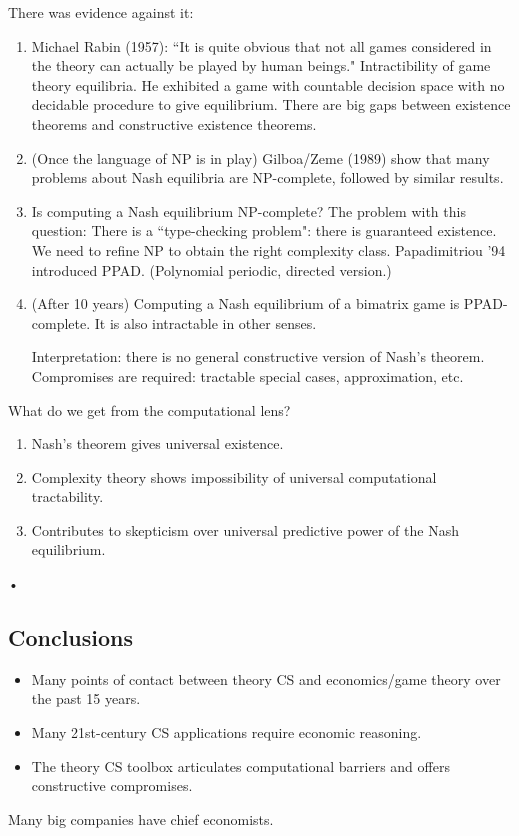 There was evidence against it:
\begin{enumerate}
\item
Michael Rabin (1957): ``It is quite obvious that not all games considered in the theory can actually be played by human beings." Intractibility of game theory equilibria. He exhibited a game with countable decision space with no decidable procedure to give equilibrium. There are big gaps between existence theorems and constructive existence theorems.
\item (Once the language of NP is in play)
Gilboa/Zeme (1989) show that many problems about Nash equilibria are NP-complete, followed by similar results.
\item
Is computing a Nash equilibrium NP-complete? %
The problem with this question: There is a ``type-checking problem": there is guaranteed existence. We need to refine NP to obtain the right complexity class. Papadimitriou '94 introduced PPAD. (Polynomial periodic, directed version.) %
\item (After 10 years) Computing a Nash equilibrium of a bimatrix game is PPAD-complete. It is also intractable in other senses.

Interpretation: there is no general constructive version of Nash's theorem. Compromises are required: tractable special cases, approximation, etc.
\end{enumerate}
What do we get from the computational lens?
\begin{enumerate}
\item
Nash's theorem gives universal existence.
\item
Complexity theory shows impossibility of universal computational tractability.
\item Contributes to skepticism over universal predictive power of the Nash equilibrium.
\end{enumerate}•
\subsection{Conclusions}

\begin{itemize}
\item
Many points of contact between theory CS and economics/game theory over the past 15 years.
\item
Many 21st-century CS applications require economic reasoning.
\item
The theory CS toolbox articulates computational barriers and offers constructive compromises.
\end{itemize}
Many big companies have chief economists.

